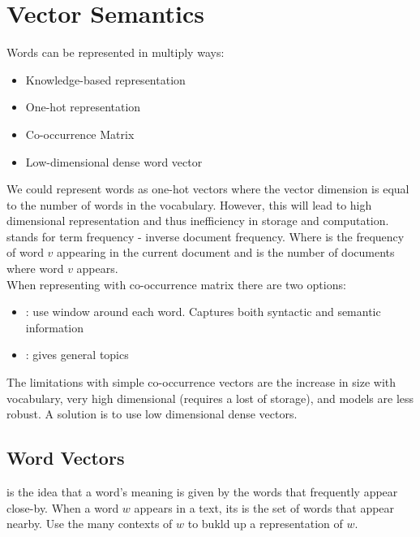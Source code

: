 \documentclass{article}
\begin{document}
\section{Vector Semantics}

Words can be represented in multiply ways:
\begin{itemize}
  \item Knowledge-based representation 
  \item One-hot representation 
  \item Co-occurrence Matrix 
  \item Low-dimensional dense word vector
\end{itemize}

We could represent words as one-hot vectors where the vector dimension is equal to the number of words in the vocabulary. However, this will lead to high dimensional representation and thus inefficiency in storage and computation. \\ 

 stands for term frequency - inverse document frequency. Where  is the frequency of word $v$ appearing in the current document and  is the number of documents where word $v$ appears. \\ 

When representing with co-occurrence matrix there are two options: 
\begin{itemize}
  \item {}: use window around each word. Captures boith syntactic and semantic information 
  \item {}: gives general topics 
\end{itemize}

The limitations with simple co-occurrence vectors are the increase in size with vocabulary, very high dimensional (requires a lost of storage), and models are less robust. A solution is to use low dimensional dense vectors. \\ 

\subsection{Word Vectors}

 is the idea that a word's meaning is given by the words that frequently appear close-by. When a word $w$ appears in a text, its  is the set of words that appear nearby. Use the many contexts of $w$ to bukld up a representation of $w$. \\ 
\end{document}
